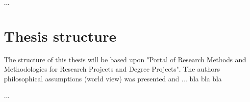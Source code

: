 
...

\section{Thesis structure}
The structure of this thesis will be based upon "Portal of Research Methods and Methodologies for Research Projects and Degree Projects"\cite{Hakansson2013}. The authors philosophical assumptions (world view) was presented and ... bla bla bla

...